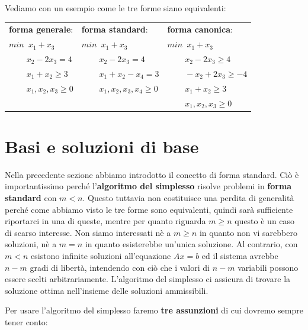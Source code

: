 \documentclass[11pt]{book}
\begin{document}
Vediamo con un esempio come le tre forme siano equivalenti:

\begin{center}
  
  \begin{tabular}{|l|l|l|}
    \hline
    {\bf forma generale}: & {\bf forma standard}: & {\bf forma canonica}:\\
    $min\phantom{a}x_1 + x_3$ &    $min\phantom{a}x_1 + x_3$ &    $min\phantom{a}x_1 + x_3$ \\
    $\phantom{aaaa}x_2 - 2x_3 = 4$ &    $\phantom{aaaa}x_2 - 2x_3 = 4$ &    $\phantom{aaaa}x_2 - 2x_3 \geq 4$ \\
    $\phantom{aaaa}x_1 + x_2 \geq 3$ &    $\phantom{aaaa}x_1 + x_2 - x_4 = 3$ &    $\phantom{aaaa}-x_2 + 2x_3 \geq -4$ \\
    $\phantom{aaaa}x_1, x_2, x_3 \geq 0$ &    $\phantom{aaaa}x_1, x_2,
    x_3, x_4 \geq 0$ &    $\phantom{aaaa}x_1 + x_2 \geq 3$ \\
    & &     $\phantom{aaaa}x_1, x_2, x_3 \geq 0$ \\
    \hline
  \end{tabular}

\end{center}



\section{Basi e soluzioni di base}

Nella precedente sezione abbiamo introdotto il concetto di forma
standard. Ci\`o \`e importantissimo perch\'e l'{\bf algoritmo del
  simplesso} risolve problemi in {\bf forma standard} con {\bf
  $m<n$}. Questo tuttavia non costituisce una perdita di generalit\`a
perch\'e come abbiamo visto le tre forme sono equivalenti, quindi
sar\`a sufficiente riportarci in una di queste, mentre per quanto
riguarda $m \geq n$ questo \`e un caso di scarso interesse. Non siamo
interessati n\`e a $m \geq n$ in quanto non vi sarebbero soluzioni,
n\`e a $m = n$ in quanto esisterebbe un'unica soluzione. Al contrario,
con $m < n$ esistono infinite soluzioni all'equazione $Ax=b$ ed il
sistema avrebbe $n-m$ gradi di libert\`a, intendendo con ci\`o che i
valori di $n-m$ variabili possono essere scelti
arbitrariamente. L'algoritmo del simplesso ci assicura di trovare la
soluzione ottima nell'insieme delle soluzioni ammissibili.

Per usare l'algoritmo del simplesso faremo {\bf tre assunzioni} di cui
dovremo sempre tener conto:
\end{document}

